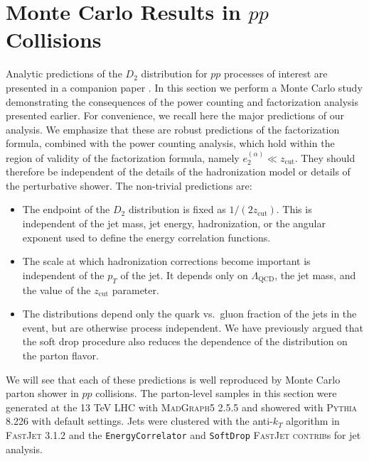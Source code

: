 \documentclass[a4paper,11pt]{article}
\newcommand{\ecf}[2]{e_{#1}^{(#2)}}
\def\zcut{z_{\text{cut}}}
\newcommand{\pythia}[1]{\textsc{Pythia\xspace #1}}
\newcommand{\madgraph}[1]{\textsc{MadGraph5\xspace #1}}
\newcommand{\fastjet}[1]{\textsc{FastJet\xspace #1}}
\begin{document}
\section{Monte Carlo Results in $pp$ Collisions}\label{sec:pppred}






Analytic predictions of the $D_2$ distribution for $pp$ processes of interest are presented in a companion paper \cite{Larkoski:2017iuy}. In this section we perform a Monte Carlo study demonstrating the consequences of the power counting and factorization analysis presented earlier. For convenience, we recall here the major predictions of our analysis. We emphasize that these are robust predictions of the factorization formula, combined with the power counting analysis, which hold within the region of validity of the factorization formula, namely $\ecf{2}{\alpha}\ll \zcut$. They should therefore be independent of the details of the hadronization model or details of the perturbative shower. The non-trivial predictions are:
\begin{itemize}
\item The endpoint of the $D_2$ distribution is fixed as $1/(2\zcut)$. This is independent of the jet mass, jet energy, hadronization, or the angular exponent used to define the energy correlation functions.
\item The scale at which hadronization corrections become important is independent of the $p_T$ of the jet. It depends only on $\Lambda_{\text{QCD}}$, the jet mass, and the value of the $\zcut$ parameter.
\item The distributions depend only the quark vs.~gluon fraction of the jets in the event, but are otherwise process independent. We have previously argued that the soft drop procedure also reduces the dependence of the distribution on the parton flavor.
\end{itemize}
We will see that each of these predictions is well reproduced by Monte Carlo parton shower in $pp$ collisions. The parton-level samples in this section were generated at the 13 TeV LHC with \madgraph{2.5.5} \cite{Alwall:2014hca} and showered with \pythia{8.226} \cite{Sjostrand:2006za,Sjostrand:2014zea} with default settings.  Jets were clustered with the anti-$k_T$ algorithm \cite{Cacciari:2008gp} in \fastjet{3.1.2}  \cite{Cacciari:2011ma} and the \texttt{EnergyCorrelator} and \texttt{SoftDrop} \fastjet{contrib}s \cite{Cacciari:2011ma,fjcontrib} for jet analysis.
\end{document}
